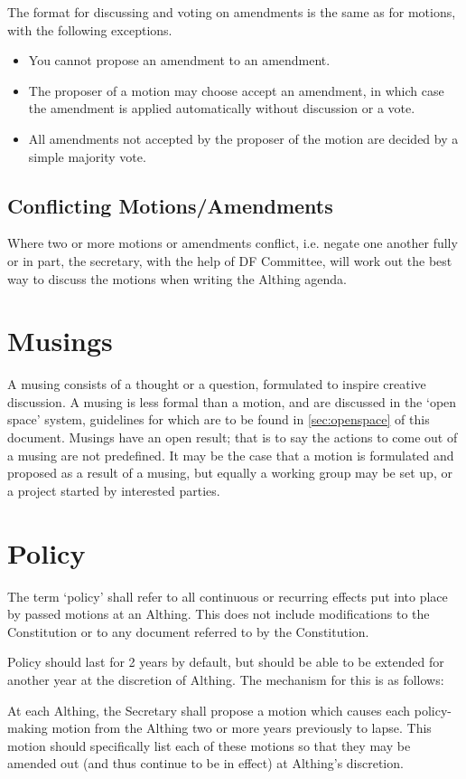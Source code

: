 \documentclass[a4paper, 11pt]{article} %
\begin{document}
The format for discussing and voting on amendments is the same as for motions, with the following exceptions.
\begin{itemize}
\item You cannot propose an amendment to an amendment.
\item The proposer of a motion may choose accept an amendment, in which case the amendment is applied automatically without discussion or a vote.
\item All amendments not accepted by the proposer of the motion are decided by a simple majority vote.
\end{itemize}

\subsection{Conflicting Motions/Amendments}
\label{sec:conflicting}
Where two or more motions or amendments conflict, i.e. negate one another fully or in part, the secretary, with the help of DF Committee, will work out the best way to discuss the motions when writing the Althing agenda.

\section{Musings}
A musing consists of a thought or a question, formulated to inspire creative discussion.  A musing is less formal than a motion, and are discussed in the `open space' system, guidelines for which are to be found in \autoref{sec:openspace} of this document.  Musings have an open result; that is to say the actions to come out of a musing are not predefined.  It may be the case that a motion is formulated and proposed as a result of a musing, but equally a working group may be set up, or a project started by interested parties.

\section{Policy}
The term `policy' shall refer to all continuous or recurring effects put into place by passed motions at an Althing. This does not include modifications to the Constitution or to any document referred to by the Constitution.

Policy should last for 2 years by default, but should be able to be extended for another year at the discretion of Althing. The mechanism for this is as follows:

At each Althing, the Secretary shall propose a motion which causes each policy-making motion from the Althing two or more years previously to lapse. This motion should specifically list each of these motions so that they may be amended out (and thus continue to be in effect) at Althing's discretion.
\end{document}
